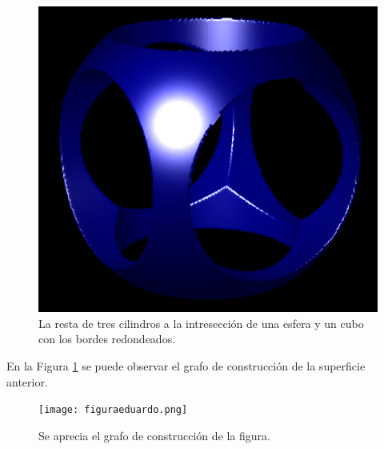 \documentclass[12pt]{article}
\begin{document}
\begin{figure}[h!]
\includegraphics[width=0.7\linewidth,center]{g2.png}
\caption{La resta de tres cilindros a la intresección de una esfera y un cubo con los bordes redondeados.}
\end{figure}

En la Figura \ref{grafoed} se puede observar el grafo de construcción de la superficie anterior. 
\begin{figure}[h!]
\texttt{[image: figuraeduardo.png]}
\caption{Se aprecia el grafo de construcción de la figura.}
\label{grafoed}
\end{figure}
\end{document}
